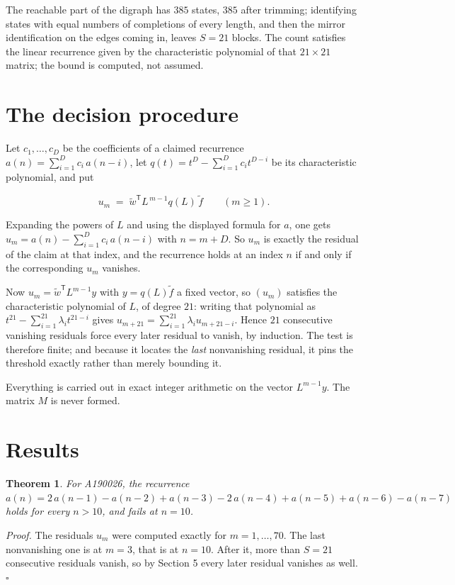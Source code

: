 \documentclass[11pt]{article}
\newtheorem{theorem}{Theorem}
\theoremstyle{definition}
\begin{document}
The reachable part of the digraph has $385$ states, $385$ after trimming; identifying states with equal numbers of completions of every length, and then the mirror identification on the edges coming in, leaves $S = 21$ blocks. The count satisfies the linear recurrence given by the characteristic polynomial of that $21\times21$ matrix; the bound is computed, not assumed.

\section{The decision procedure}

Let $c_1,\dots,c_D$ be the coefficients of a claimed recurrence $a(n) = \sum_{i=1}^{D} c_i\,a(n-i)$, let $q(t) = t^{D} - \sum_{i=1}^{D} c_i t^{D-i}$ be its characteristic polynomial, and put

\[u_m \;=\; \tilde w^{\mathsf T} L^{\,m-1} q(L)\,\tilde f \qquad (m \ge 1).\]

Expanding the powers of $L$ and using the displayed formula for $a$, one gets $u_m = a(n) - \sum_{i=1}^{D} c_i\,a(n-i)$ with $n = m + D$. So $u_m$ is exactly the residual of the claim at that index, and the recurrence holds at an index $n$ if and only if the corresponding $u_m$ vanishes.

Now $u_m = \tilde w^{\mathsf T} L^{m-1} y$ with $y = q(L)\tilde f$ a fixed vector, so $(u_m)$ satisfies the characteristic polynomial of $L$, of degree $21$: writing that polynomial as $t^{21} - \sum_{i=1}^{21} \lambda_i t^{21-i}$ gives $u_{m+21} = \sum_{i=1}^{21} \lambda_i u_{m+21-i}$. Hence $21$ consecutive vanishing residuals force every later residual to vanish, by induction. The test is therefore finite; and because it locates the {\itshape last} nonvanishing residual, it pins the threshold exactly rather than merely bounding it.

Everything is carried out in exact integer arithmetic on the vector $L^{m-1}y$. The matrix $M$ is never formed.

\section{Results}

\begin{theorem} For A190026, the recurrence $a(n) = 2\,a(n-1) - a(n-2) + a(n-3) - 2\,a(n-4) + a(n-5) + a(n-6) - a(n-7)$ holds for every $n > 10$, and fails at $n = 10$.\end{theorem}

{\itshape Proof.} The residuals $u_m$ were computed exactly for $m = 1,\dots,70$. The last nonvanishing one is at $m = 3$, that is at $n = 10$. After it, more than $S = 21$ consecutive residuals vanish, so by Section 5 every later residual vanishes as well. $\square$
\end{document}
